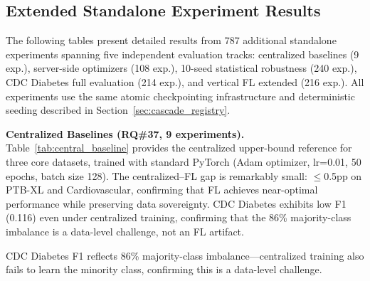 \documentclass[conference,a4paper]{IEEEtran}
\begin{document}
\subsection{Extended Standalone Experiment Results}
\label{sec:extended_standalone}

The following tables present detailed results from 787 additional standalone experiments spanning five independent evaluation tracks: centralized baselines (9 exp.), server-side optimizers (108 exp.), 10-seed statistical robustness (240 exp.), CDC Diabetes full evaluation (214 exp.), and vertical FL extended (216 exp.). All experiments use the same atomic checkpointing infrastructure and deterministic seeding described in Section~\ref{sec:cascade_registry}.

\smallskip\noindent\textbf{Centralized Baselines (RQ\#37, 9 experiments).}
Table~\ref{tab:central_baseline} provides the centralized upper-bound reference for three core datasets, trained with standard PyTorch (Adam optimizer, lr=0.01, 50 epochs, batch size 128). The centralized--FL gap is remarkably small: $\leq$0.5pp on PTB-XL and Cardiovascular, confirming that FL achieves near-optimal performance while preserving data sovereignty. CDC Diabetes exhibits low F1 (0.116) even under centralized training, confirming that the 86\% majority-class imbalance is a data-level challenge, not an FL artifact.

\begin{table}[htbp]
\centering
\caption{Centralized Training Baselines (Upper-Bound Reference). Mean $\pm$ std over 3 seeds (42, 123, 456). Adam optimizer, lr=0.01, 50 epochs.}
\label{tab:central_baseline}
\par{\footnotesize CDC Diabetes F1 reflects 86\% majority-class imbalance---centralized training also fails to learn the minority class, confirming this is a data-level challenge.}
\end{table}
\end{document}
